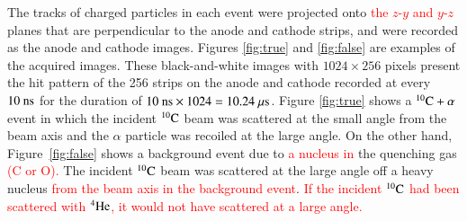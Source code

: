 \documentclass{jps-cp}
\begin{document}
The tracks of charged particles in each event were projected onto \textcolor{red}{the $z$-$y$ and $y$-$z$} planes that are perpendicular to the anode and cathode strips, and were recorded as the anode and cathode images.
Figures \ref{fig:true} and \ref{fig:false} are examples of the acquired images.
These black-and-white images with $1024\times 256$ pixels present the hit pattern of the 256 strips on the anode and cathode recorded
at every $10~\rm{ns}$ for the duration of $10~\rm{ns}\times 1024 = 10.24~\rm{\mu s}$.
Figure \ref{fig:true} shows a ${}^{10}\rm{C}+\alpha$ event
in which the incident ${}^{10}\rm{C}$ beam was scattered at the small angle from the beam axis and the $\alpha$ particle was
recoiled at the large angle.
On the other hand, Figure~\ref{fig:false} shows a background event due to \textcolor{red}{a nucleus in} the quenching gas \textcolor{red}{(C or O).}
The incident ${}^{10}\rm{C}$ beam was scattered at the large angle off a heavy nucleus \textcolor{red}{from the beam axis
in the background event}.
\textcolor{red}{If the incident ${}^{10}\rm{C}$ had been scattered with ${}^{4}\rm{He}$, it would not have scattered at a large angle.}
\end{document}
